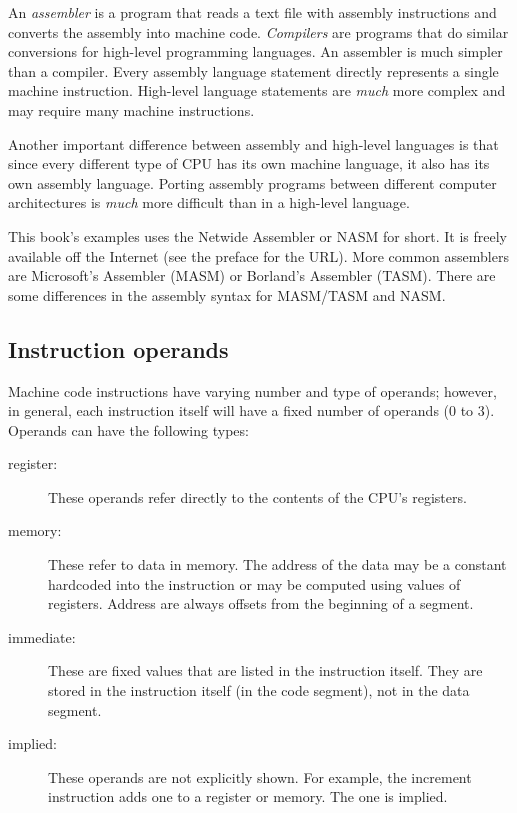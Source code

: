 An \emph{assembler}  is a program that reads a text
file with assembly instructions and converts the assembly into machine
code.  \emph{Compilers}  are programs that do similar
conversions for high-level programming languages. An assembler is much
simpler than a compiler.  Every
assembly language statement directly represents a single machine
instruction. High-level language statements are \emph{much} more
complex and may require many machine instructions.

Another important difference between assembly and high-level languages is that
since every different type of CPU has its own machine language, it also has
its own assembly language. Porting assembly programs between different computer
architectures is \emph{much} more difficult than in a high-level language.

This book's examples uses the Netwide Assembler or NASM 
for short. It is freely available off the Internet (see the preface
for the URL). More common assemblers are Microsoft's Assembler (MASM)
 or Borland's Assembler (TASM).  There are
some differences in the assembly syntax for MASM/TASM and NASM.

\subsection{Instruction operands}

Machine code instructions have varying number and type of operands; however,
in general, each instruction itself will have a fixed number of operands (0
to 3). Operands can have the following types:
\begin{description}
\item[register:]
These operands refer directly to the contents of the CPU's registers.
\item[memory:]
These refer to data in memory. The address of the data may be a constant
hardcoded into the instruction or may be computed using values of registers.
Address are always offsets from the beginning of a segment.
\item[immediate:]
These are fixed values that are listed in the instruction itself. They are
stored in the instruction itself (in the code segment), not in the data
segment.
\item[implied:]
These operands are not explicitly shown. For example, the increment 
instruction adds one to a register or memory. The one is implied.
\end{description}

